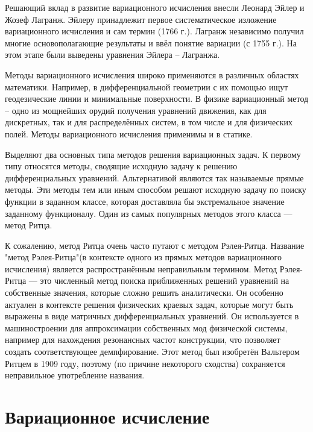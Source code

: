 \documentclass{article}
\begin{document}
Решающий вклад в развитие вариационного исчисления внесли Леонард Эйлер и Жозеф Лагранж. Эйлеру принадлежит первое систематическое изложение вариационного исчисления и сам термин (1766 г.). Лагранж независимо получил многие основополагающие результаты и ввёл понятие вариации (с 1755 г.). На этом этапе были выведены уравнения Эйлера – Лагранжа.

Методы вариационного исчисления широко применяются в различных областях математики. Например, в дифференциальной геометрии с их помощью ищут геодезические линии и минимальные поверхности. В физике вариационный метод – одно из мощнейших орудий получения уравнений движения, как для дискретных, так и для распределённых систем, в том числе и для физических полей. Методы вариационного исчисления применимы и в статике.

Выделяют два основных типа методов решения вариационных задач. К первому типу относятся методы, сводящие исходную задачу к решению дифференциальных уравнений. Альтернативой являются так называемые прямые методы. Эти методы тем или иным способом решают исходную задачу по поиску функции в заданном классе, которая доставляла бы экстремальное значение заданному функционалу. Один из самых популярных методов этого класса — метод Ритца.

\begin{warn}[Важно!]
К сожалению, метод Ритца очень часто путают с методом Рэлея-Ритца. Название "метод Рэлея-Ритца"\;(в контексте одного из прямых методов вариационного исчисления) является распространённым неправильным термином. Метод Рэлея-Ритца --- это численный метод поиска приближенных решений уравнений на собственные значения, которые сложно решить аналитически. Он особенно актуален в контексте решения физических краевых задач, которые могут быть выражены в виде матричных дифференциальных уравнений. Он используется в машиностроении для аппроксимации собственных мод физической системы, например для нахождения резонансных частот конструкции, что позволяет создать соответствующее демпфирование. Этот метод был изобретён Вальтером Ритцем в 1909 году, поэтому (по причине некоторого сходства) сохраняется неправильное употребление названия.
\end{warn}


\newpage

\section{Вариационное исчисление}
\end{document}
